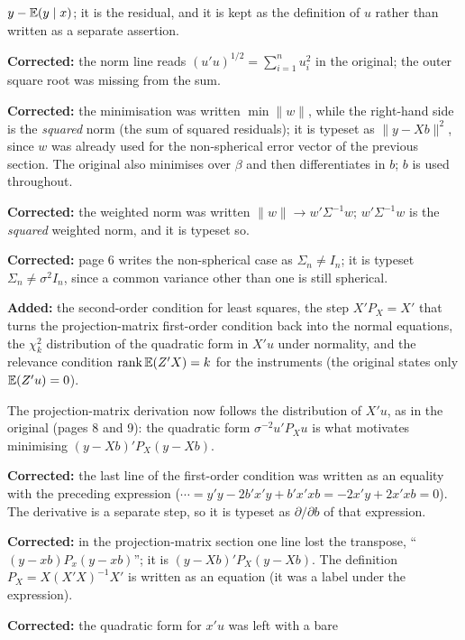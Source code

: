 \documentclass[11pt]{article}
\begin{document}
\begin{transcriptnotes}
        $y-\mathbb{E}(y\mid x)$; it is the residual, and it is kept as the definition of
        $u$ rather than written as a separate assertion.
  \item \textbf{Corrected:} the norm line reads
        $(u'u)^{1/2}=\sum_{i=1}^{n}u_i^2$ in the original; the outer square root was
        missing from the sum.
  \item \textbf{Corrected:} the minimisation was written $\min\|w\|$, while the
        right-hand side is the \emph{squared} norm (the sum of squared residuals);
        it is typeset as $\|y-Xb\|^2$, since $w$ was already used for the
        non-spherical error vector of the previous section. The original also
        minimises over $\beta$ and then differentiates in $b$; $b$ is used
        throughout.
  \item \textbf{Corrected:} the weighted norm was written $\|w\|\to w'\Sigma^{-1}w$;
        $w'\Sigma^{-1}w$ is the \emph{squared} weighted norm, and it is typeset so.
  \item \textbf{Corrected:} page 6 writes the non-spherical case as
        $\Sigma_n\ne I_n$; it is typeset $\Sigma_n\ne\sigma^2I_n$, since a common
        variance other than one is still spherical.
  \item \textbf{Added:} the second-order condition for least squares, the step
        $X'P_X=X'$ that turns the projection-matrix first-order condition back into
        the normal equations, the $\chi^2_k$ distribution of the quadratic form in
        $X'u$ under normality, and the relevance condition
        $\operatorname{rank}\mathbb{E}(Z'X)=k$ for the instruments (the original states only
        $\mathbb{E}(Z'u)=0$).
  \item The projection-matrix derivation now follows the distribution of $X'u$,
        as in the original (pages 8 and 9): the quadratic form
        $\sigma^{-2}u'P_Xu$ is what motivates minimising $(y-Xb)'P_X(y-Xb)$.
  \item \textbf{Corrected:} the last line of the first-order condition was written
        as an equality with the preceding expression
        ($\cdots=y'y-2b'x'y+b'x'xb=-2x'y+2x'xb=0$). The derivative is a separate
        step, so it is typeset as $\partial/\partial b$ of that expression.
  \item \textbf{Corrected:} in the projection-matrix section one line lost the
        transpose, ``$(y-xb)P_x(y-xb)$''; it is $(y-Xb)'P_X(y-Xb)$. The definition
        $P_X=X(X'X)^{-1}X'$ is written as an equation (it was a label under the
        expression).
  \item \textbf{Corrected:} the quadratic form for $x'u$ was left with a bare

\end{transcriptnotes}
\end{document}
